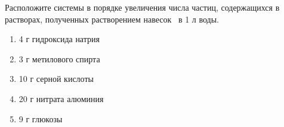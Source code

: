 
Расположите системы в
порядке увеличения числа частиц, содержащихся в растворах, полученных
растворением навесок  в 1 л воды.

\begin{enumerate}
    \item 4 г гидроксида натрия
    \item 3 г метилового спирта
    \item 10 г серной кислоты
    \item 20 г нитрата алюминия
    \item 9 г глюкозы
\end{enumerate}

